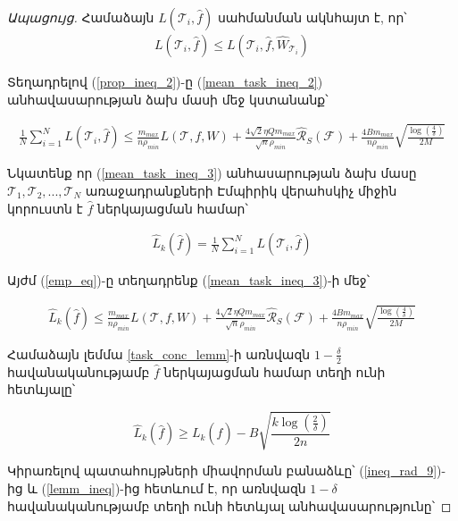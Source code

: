 \documentclass[12pt]{article}
\begin{document}
\begin{proof}[Ապացույց]
\noindent Համաձայն $L(\mathcal{T}_i, \hat{f})$ սահմանման ակնհայտ է, որ՝
\begin{align}
\label{prop_ineq_2}
L(\mathcal{T}_i, \hat{f}) \leq L(\mathcal{T}_i, \hat{f}, \hat{W}_{\mathcal{T}_i})
\end{align}

\noindent Տեղադրելով  (\ref{prop_ineq_2})-ը  (\ref{mean_task_ineq_2}) անհավասարության ձախ մասի մեջ կստանանք՝

\begin{align}
\label{mean_task_ineq_3}
\frac{1}{N}\sum_{i=1}^N L(\mathcal{T}_i,\hat{f}) \leq  \frac{m_{max}}{n \rho_{min}}  L(\mathcal{T},f, W) +
\frac{4\sqrt{2} \eta Qm_{max}}{\sqrt{n}\rho_{min}} \hat{\mathcal{R}}_S(\mathcal{F})+    \frac{4Bm_{max}}{n\rho_{min}}\sqrt{\frac{\log \left( \frac{4}{\delta} \right)}{2M}}
\end{align}



Նկատենք որ (\ref{mean_task_ineq_3}) անհասարության ձախ մասը $\mathcal{T}_1,\mathcal{T}_2, ...,\mathcal{T}_N$ առաջադրանքների Էմպիրիկ վերահսկիչ միջին կորուստն է $\hat{f}$ ներկայացման համար՝


\begin{align}
\label{emp_eq}
\hat{L}_k(\hat{f}) = \frac{1}{N}\sum_{i=1}^NL(\mathcal{T}_i, \hat{f})
\end{align}

Այժմ (\ref{emp_eq})-ը տեղադրենք (\ref{mean_task_ineq_3})-ի մեջ՝
 
\begin{align}
\label{ineq_rad_9}
\hat{L}_k(\hat{f}) \leq    \frac{m_{max}}{n \rho_{min}}  L(\mathcal{T}, f, W) +
\frac{4 \sqrt{2} \eta Qm_{max}}{\sqrt{n}\rho_{min}} \hat{\mathcal{R}}_S(\mathcal{F})+    \frac{4Bm_{max}}{n\rho_{min}}\sqrt{\frac{\log \left( \frac{4}{\delta} \right)}{2M}}
\end{align}

Համաձայն լեմմա \ref{task_conc_lemm}-ի առնվազն $1-\frac{\delta}{2}$ հավանականությամբ $\hat{f}$ ներկայացման համար տեղի ունի հետևյալը՝


\begin{equation}
\label{lemm_ineq}
\hat{L}_k(\hat{f}) \geq L_k(\hat{f}) - B\sqrt{\frac{k\log \left(\frac{2}{\delta}\right) }{2n}}
\end{equation}



Կիրառելով պատահույթների միավորման բանաձևը՝ (\ref{ineq_rad_9})-ից  և (\ref{lemm_ineq})-ից  հետևում է, որ առնվազն $1-\delta$ հավանականությամբ տեղի ունի հետևյալ անհավասարությունը՝


\end{proof}
\end{document}
